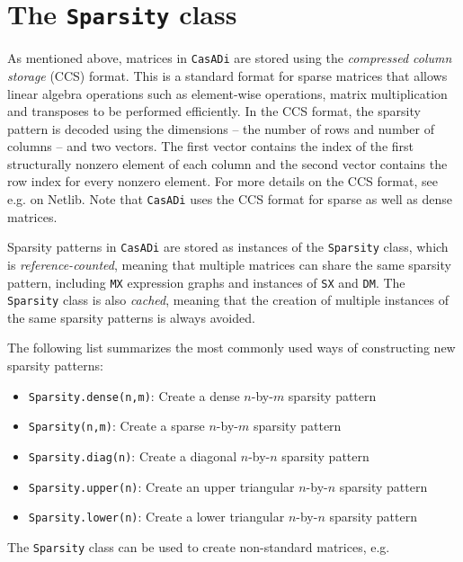 \documentclass[a4paper,12pt]{book}
\newcommand{\CasADi}{\texttt{CasADi}\xspace}
\newcommand{\python}[1]{\lstinline[language=Python]{#1}}
\begin{document}
\section{The \texttt{Sparsity} class} \label{sec:sparsity_class}
As mentioned above, matrices in \CasADi are stored using the \emph{compressed column storage} (CCS) format. This is a standard format for sparse matrices that allows linear algebra operations such as element-wise operations, matrix multiplication and transposes to be performed efficiently. In the CCS format, the sparsity pattern is decoded using the dimensions -- the number of rows and number of columns -- and two vectors. The first vector contains the index of the first structurally nonzero element of each column and the second vector contains the row index for every nonzero element. For more details on the CCS format, see e.g.  on Netlib. Note that \CasADi uses the CCS format for sparse as well as dense matrices.

Sparsity patterns in \CasADi are stored as instances of the \texttt{Sparsity} class, which is \emph{reference-counted}, meaning that multiple matrices can share the same sparsity pattern, including \texttt{MX} expression graphs and instances of \texttt{SX} and \texttt{DM}. The \texttt{Sparsity} class is also \emph{cached}, meaning that the creation of multiple instances of the same sparsity patterns is always avoided.

The following list summarizes the most commonly used ways of constructing new sparsity patterns:
\begin{itemize}
  \item \python{Sparsity.dense(n,m)}: Create a dense $n$-by-$m$ sparsity pattern
  \item \python{Sparsity(n,m)}: Create a sparse $n$-by-$m$ sparsity pattern
  \item \python{Sparsity.diag(n)}: Create a diagonal $n$-by-$n$ sparsity pattern
  \item \python{Sparsity.upper(n)}: Create an upper triangular $n$-by-$n$ sparsity pattern
  \item \python{Sparsity.lower(n)}: Create a lower triangular $n$-by-$n$ sparsity pattern
\end{itemize}

The \texttt{Sparsity} class can be used to create non-standard matrices, e.g.
\end{document}
